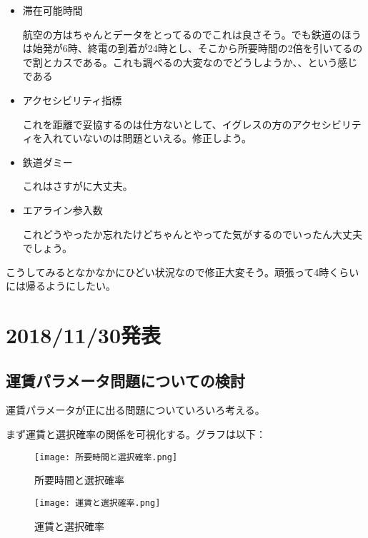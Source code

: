 \documentclass{jsarticle}
\begin{document}
\begin{itemize}
\item 滞在可能時間

航空の方はちゃんとデータをとってるのでこれは良さそう。でも鉄道のほうは始発が6時、終電の到着が24時とし、そこから所要時間の2倍を引いてるので割とカスである。これも調べるの大変なのでどうしようか、、という感じである

\item アクセシビリティ指標

これを距離で妥協するのは仕方ないとして、イグレスの方のアクセシビリティを入れていないのは問題といえる。修正しよう。

\item 鉄道ダミー

これはさすがに大丈夫。

\item エアライン参入数

これどうやったか忘れたけどちゃんとやってた気がするのでいったん大丈夫でしょう。

\end{itemize}

こうしてみるとなかなかにひどい状況なので修正大変そう。頑張って4時くらいには帰るようにしたい。

\section{2018/11/30発表}

\subsection{運賃パラメータ問題についての検討}

運賃パラメータが正に出る問題についていろいろ考える。

まず運賃と選択確率の関係を可視化する。グラフは以下：

\begin{figure}[htbp]
 \begin{minipage}{0.5\hsize}
  \begin{center}
   \texttt{[image: 所要時間と選択確率.png]}
  \end{center}
  \caption{所要時間と選択確率}
  \label{fig:one}
 \end{minipage}
 \begin{minipage}{0.5\hsize}
 \begin{center}
  \texttt{[image: 運賃と選択確率.png]}
 \end{center}
  \caption{運賃と選択確率}
  \label{fig:two}
 \end{minipage}
\end{figure}
\end{document}
